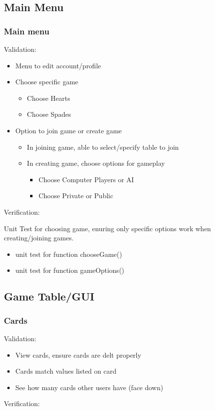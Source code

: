 \documentclass[11pt, titlepage]{article}
\begin{document}
		\subsection{Main Menu}
			\subsubsection{Main menu}
			Validation:
				\begin{itemize}
					\item Menu to edit account/profile
					\item Choose specific game
					\begin{itemize}
						\item Choose Hearts
						\item Choose Spades
					\end{itemize}
					\item Option to join game or create game
					\begin{itemize}
						 \item In joining game, able to select/specify table to join
						 \item In creating game, choose options for gameplay
						 \begin{itemize}
						 	\item Choose Computer Players or AI
						 	\item Choose Private or Public
						 \end{itemize}
					\end{itemize}
				\end{itemize}
			Verification:
			
			Unit Test for choosing game, enuring only specific options work when creating/joining games.
			\begin{itemize}
				\item unit test for function chooseGame()
				\item unit test for function gameOptions()		
			\end{itemize}
		\subsection{Game Table/GUI}
			\subsubsection{Cards}
			Validation:
			\begin{itemize}
				\item View  cards, ensure cards are delt properly
				\item Cards match values listed on card
				\item See how many cards other users have (face down) 
			\end{itemize}
			Verification:
			
\end{document}

